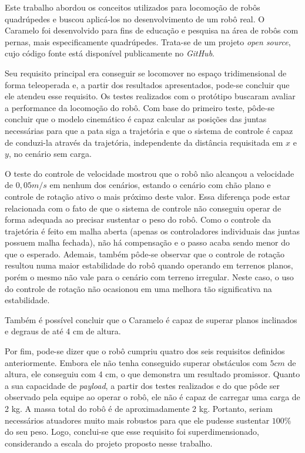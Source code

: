 \documentclass[../main.tex]{subfiles}
\begin{document}
  Este trabalho abordou os conceitos utilizados para locomoção de robôs quadrúpedes e buscou aplicá-los no desenvolvimento de um robô real. O Caramelo foi desenvolvido para fins de educação e pesquisa na área de robôs com pernas, mais especificamente quadrúpedes. Trata-se de um projeto \textit{open source}, cujo código fonte está disponível publicamente no \textit{GitHub}. 
  
  Seu requisito principal era conseguir se locomover no espaço tridimensional de forma teleoperada e, a partir dos resultados apresentados, pode-se concluir que ele atendeu esse requisito. Os testes realizados com o protótipo buscaram avaliar a performance da locomoção do robô. Com base do primeiro teste, pôde-se concluir que o modelo cinemático é capaz calcular as posições das juntas necessárias para que a pata siga a trajetória e que o sistema de controle é capaz de conduzi-la através da trajetória, independente da distância requisitada em $x$ e $y$, no cenário sem carga. 
  
  O teste do controle de velocidade mostrou que o robô não alcançou a velocidade de $0,05 m/s$ em nenhum dos cenários, estando o cenário com chão plano e controle de rotação ativo o mais próximo deste valor. Essa diferença pode estar relacionada com o fato de que o sistema de controle não conseguiu operar de forma adequada ao precisar sustentar o peso do robô. Como o controle da trajetória é feito em malha aberta (apenas os controladores individuais das juntas possuem malha fechada), não há compensação e o passo acaba sendo menor do que o esperado. Ademais, também pôde-se observar que o controle de rotação resultou numa maior estabilidade do robô quando operando em terrenos planos, porém o mesmo não vale para o cenário com terreno irregular. Neste caso, o uso do controle de rotação não ocasionou em uma melhora tão significativa na estabilidade.
  
  Também é possível concluir que o Caramelo é capaz de superar planos inclinados e degraus de até 4 cm de altura. 

  Por fim, pode-se dizer que o robô cumpriu quatro dos seis requisitos definidos anteriormente. Embora ele não tenha conseguido superar obstáculos com $5cm$ de altura, ele conseguiu com 4 cm, o que demonstra um resultado promissor. Quanto a sua capacidade de \textit{payload}, a partir dos testes realizados e do que pôde ser observado pela equipe ao operar o robô, ele não é capaz de carregar uma carga de 2 kg. A massa total do robô é de aproximadamente 2 kg. Portanto, seriam necessários atuadores muito mais robustos para que ele pudesse sustentar $100\%$ do seu peso. Logo, conclui-se que esse requisito foi superdimensionado, considerando a escala do projeto proposto nesse trabalho.
\end{document}
